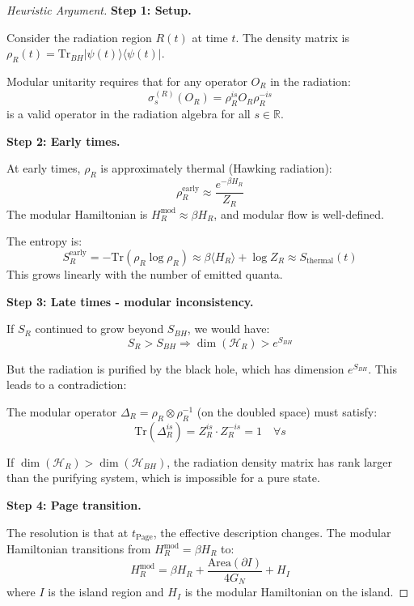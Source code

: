 \documentclass[12pt,a4paper]{article}
\begin{document}
\begin{proof}[Heuristic Argument]
\textbf{Step 1: Setup.}

Consider the radiation region $R(t)$ at time $t$. The density matrix is $\rho_R(t) = \text{Tr}_{BH}|\psi(t)\rangle \langle \psi(t)|$.

Modular unitarity requires that for any operator $O_R$ in the radiation:
\begin{equation}
\sigma_s^{(R)}(O_R) = \rho_R^{is} O_R \rho_R^{-is}
\end{equation}
is a valid operator in the radiation algebra for all $s \in \mathbb{R}$.

\textbf{Step 2: Early times.}

At early times, $\rho_R$ is approximately thermal (Hawking radiation):
\begin{equation}
\rho_R^{\text{early}} \approx \frac{e^{-\beta H_R}}{Z_R}
\end{equation}
The modular Hamiltonian is $H_R^{\text{mod}} \approx \beta H_R$, and modular flow is well-defined.

The entropy is:
\begin{equation}
S_R^{\text{early}} = -\text{Tr}(\rho_R \log \rho_R) \approx \beta \langle H_R \rangle + \log Z_R \approx S_{\text{thermal}}(t)
\end{equation}
This grows linearly with the number of emitted quanta.

\textbf{Step 3: Late times - modular inconsistency.}

If $S_R$ continued to grow beyond $S_{BH}$, we would have:
\begin{equation}
S_R > S_{BH} \Rightarrow \dim(\mathcal{H}_R) > e^{S_{BH}}
\end{equation}

But the radiation is purified by the black hole, which has dimension $e^{S_{BH}}$. This leads to a contradiction:

The modular operator $\Delta_R = \rho_R \otimes \rho_R^{-1}$ (on the doubled space) must satisfy:
\begin{equation}
\text{Tr}(\Delta_R^{is}) = Z_R^{is} \cdot Z_R^{-is} = 1 \quad \forall s
\end{equation}

If $\dim(\mathcal{H}_R) > \dim(\mathcal{H}_{BH})$, the radiation density matrix has rank larger than the purifying system, which is impossible for a pure state.

\textbf{Step 4: Page transition.}

The resolution is that at $t_{\text{Page}}$, the effective description changes. The modular Hamiltonian transitions from $H_R^{\text{mod}} = \beta H_R$ to:
\begin{equation}
H_R^{\text{mod}} = \beta H_R + \frac{\text{Area}(\partial I)}{4G_N} + H_I
\end{equation}
where $I$ is the island region and $H_I$ is the modular Hamiltonian on the island.


\end{proof}
\end{document}

